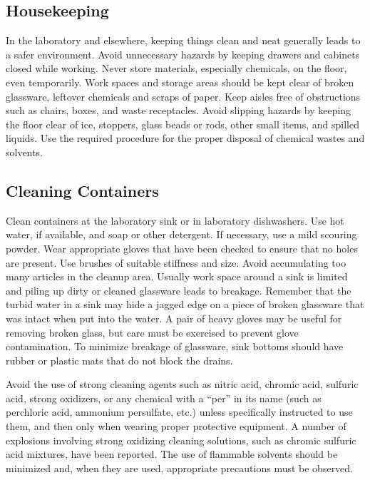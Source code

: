\documentclass[letterpaper,10pt,english]{sphinxmanual}
\begin{document}
\subsection{Housekeeping}
\label{\detokenize{Laboratory_Safety/Laboratory_Safety:housekeeping}}
In the laboratory and elsewhere, keeping things clean and neat generally leads to a safer environment. Avoid unnecessary hazards by keeping drawers and cabinets closed while working. Never store materials, especially chemicals, on the floor, even temporarily. Work spaces and storage areas should be kept clear of broken glassware, leftover chemicals and scraps of paper. Keep aisles free of obstructions such as chairs, boxes, and waste receptacles. Avoid slipping hazards by keeping the floor clear of ice, stoppers, glass beads or rods, other small items, and spilled liquids. Use the required procedure for the proper disposal of chemical wastes and solvents.


\subsection{Cleaning Containers}
\label{\detokenize{Laboratory_Safety/Laboratory_Safety:cleaning-containers}}
Clean containers at the laboratory sink or in laboratory dishwashers. Use hot water, if available, and soap or other detergent. If necessary, use a mild scouring powder. Wear appropriate gloves that have been checked to ensure that no holes are present. Use brushes of suitable stiffness and size. Avoid accumulating too many articles in the cleanup area. Usually work space around a sink is limited and piling up dirty or cleaned glassware leads to breakage. Remember that the turbid water in a sink may hide a jagged edge on a piece of broken glassware that was intact when put into the water. A pair of heavy gloves may be useful for removing broken glass, but care must be exercised to prevent glove contamination. To minimize breakage of glassware, sink bottoms should have rubber or plastic mats that do not block the drains.

Avoid the use of strong cleaning agents such as nitric acid, chromic acid, sulfuric acid, strong oxidizers, or any chemical with a “per” in its name (such as perchloric acid, ammonium persulfate, etc.) unless specifically instructed to use them, and then only when wearing proper protective equipment. A number of explosions involving strong oxidizing cleaning solutions, such as chromic sulfuric acid mixtures, have been reported. The use of flammable solvents should be minimized and, when they are used, appropriate precautions must be observed.
\end{document}
